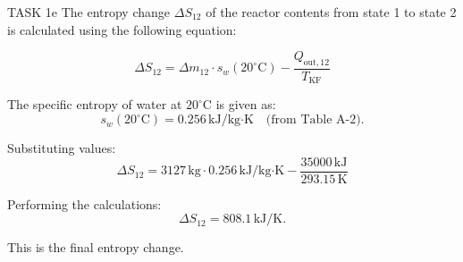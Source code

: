 TASK 1e  
The entropy change \( \Delta S_{12} \) of the reactor contents from state 1 to state 2 is calculated using the following equation:  

\[
\Delta S_{12} = \Delta m_{12} \cdot s_w(20^\circ\text{C}) - \frac{Q_{\text{out},12}}{T_{\text{KF}}}
\]

The specific entropy of water at \( 20^\circ\text{C} \) is given as:  
\[
s_w(20^\circ\text{C}) = 0.256 \, \text{kJ/kg·K} \quad \text{(from Table A-2)}.
\]

Substituting values:  
\[
\Delta S_{12} = 3127 \, \text{kg} \cdot 0.256 \, \text{kJ/kg·K} - \frac{35000 \, \text{kJ}}{293.15 \, \text{K}}
\]

Performing the calculations:  
\[
\Delta S_{12} = 808.1 \, \text{kJ/K}.
\]  

This is the final entropy change.